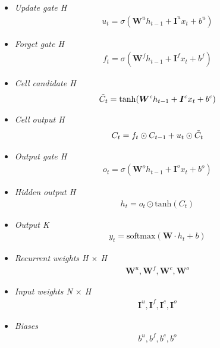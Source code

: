 \begin{itemize}
  \item \textit{Update gate H}
  \begin{align}
    u_t = \sigma(\bm{W}^u h_{t-1} + \bm{I}^u x_t + b^u)
  \end{align}

  \item \textit{Forget gate H}
  \begin{align}
    f_t = \sigma(\bm{W}^f h_{t-1} + \bm{I}^f x_t + b^f)
  \end{align}

  \item \textit{Cell candidate H}
  \begin{align}
    \Tilde{C}_t = \mathrm{tanh}(\bm{W}^c h_{t-1} + \bm{I}^c x_t + b^c)
  \end{align}

  \item \textit{Cell output H}
  \begin{align}
    C_t = f_t \odot C_{t-1} + u_t \odot \Tilde{C}_t
  \end{align}

  \item \textit{Output gate H}
  \begin{align}
    o_t = \sigma(\bm{W}^o h_{t-1} + \bm{I}^o x_t + b^o)
  \end{align}

  \item \textit{Hidden output H}
  \begin{align}
    h_t = o_t \odot \mathrm{tanh}(C_t)
  \end{align}

  \item \textit{Output K}
  \begin{align}
    y_t = \mathrm{softmax}(\bm{W} \cdot h_t + b)
  \end{align}

  \item \textit{Recurrent weights H $\times$ H}
  \begin{align}
    \bm{W}^u, \bm{W}^f, \bm{W}^c, \bm{W}^o
  \end{align}

  \item \textit{Input weights N $\times$ H}
  \begin{align}
    \bm{I}^u, \bm{I}^f, \bm{I}^c, \bm{I}^o
  \end{align}

  \item \textit{Biases}
  \begin{align}
    b^u, b^f, b^c, b^o
  \end{align}
\end{itemize}

